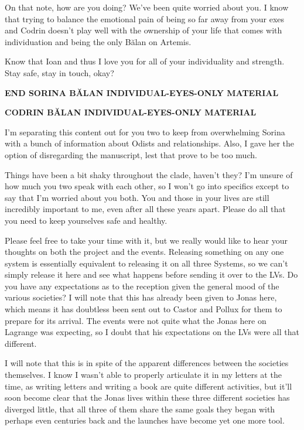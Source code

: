 On that note, how are you doing? We've been quite worried about you. I know that trying to balance the emotional pain of being so far away from your exes and Codrin doesn't play well with the ownership of your life that comes with individuation and being the only Bălan on Artemis.

Know that Ioan and thus I love you for all of your individuality and strength. Stay safe, stay in touch, okay?

\begin{center}
\textbf{END SORINA BĂLAN INDIVIDUAL-EYES-ONLY MATERIAL}
\end{center}

\begin{center}
\textbf{CODRIN BĂLAN INDIVIDUAL-EYES-ONLY MATERIAL}
\end{center}

I'm separating this content out for you two to keep from overwhelming Sorina with a bunch of information about Odists and relationships. Also, I gave her the option of disregarding the manuscript, lest that prove to be too much.

Things have been a bit shaky throughout the clade, haven't they? I'm unsure of how much you two speak with each other, so I won't go into specifics except to say that I'm worried about you both. You and those in your lives are still incredibly important to me, even after all these years apart. Please do all that you need to keep yourselves safe and healthy.

Please feel free to take your time with it, but we really would like to hear your thoughts on both the project and the events. Releasing something on any one system is essentially equivalent to releasing it on all three Systems, so we can't simply release it here and see what happens before sending it over to the LVs. Do you have any expectations as to the reception given the general mood of the various societies? I will note that this has already been given to Jonas here, which means it has doubtless been sent out to Castor and Pollux for them to prepare for its arrival. The events were not quite what the Jonas here on Lagrange was expecting, so I doubt that his expectations on the LVs were all that different.

I will note that this is in spite of the apparent differences between the societies themselves. I know I wasn't able to properly articulate it in my letters at the time, as writing letters and writing a book are quite different activities, but it'll soon become clear that the Jonas lives within these three different societies has diverged little, that all three of them share the same goals they began with perhaps even centuries back and the launches have become yet one more tool.

